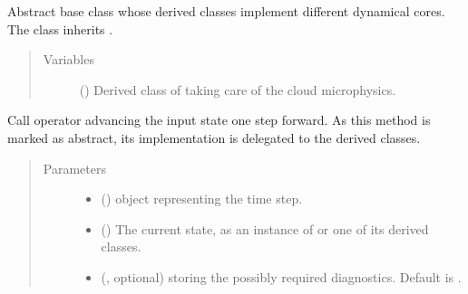 \documentclass[letterpaper,10pt,english]{sphinxmanual}
\begin{document}
\begin{fulllineitems}
\label{\detokenize{api:dycore.dycore.DynamicalCore}}
Abstract base class whose derived classes implement different dynamical cores.
The class inherits .
\begin{quote}\begin{description}
\item[{Variables}] \leavevmode
{} () \textendash{} Derived class of  taking care of the cloud microphysics.

\end{description}\end{quote}

\begin{fulllineitems}
\label{\detokenize{api:dycore.dycore.DynamicalCore.__call__}}
Call operator advancing the input state one step forward.
As this method is marked as abstract, its implementation is delegated to the derived classes.
\begin{quote}\begin{description}
\item[{Parameters}] \leavevmode\begin{itemize}
\item {} 
 () \textendash{}  object representing the time step.

\item {} 
 () \textendash{} The current state, as an instance of {\hyperref[\detokenize{api:storages.grid_data.GridData}]{}} or one of its derived classes.

\item {} 
 (, optional) \textendash{} {\hyperref[\detokenize{api:storages.grid_data.GridData}]{}} storing the possibly required diagnostics. Default is .

\end{itemize}


\end{description}
\end{quote}
\end{fulllineitems}
\end{fulllineitems}
\end{document}
